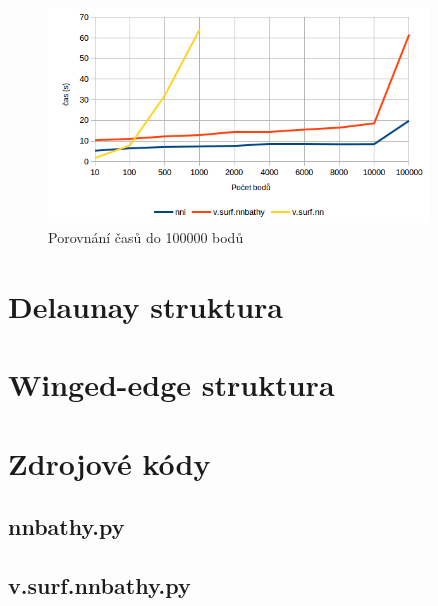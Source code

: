 \documentclass[12pt,a4paper]{article}
\begin{document}
\begin{figure}[h!]
\centering
\includegraphics[width=0.9\textwidth]{img/graf_detail.png}
\caption{Porovnání časů do 100000 bodů}
\label{fig:graf_det}
\end{figure}

\newpage
\section{Delaunay struktura}
\label{app:delaunay_struct}


\newpage
\section{Winged-edge struktura}
\label{app:edge_struct}



\newpage
\section{Zdrojové kódy}
\subsection{nnbathy.py}
\label{app:nnbathy}


\bigskip
\subsection{v.surf.nnbathy.py}
\label{app:v.surf}

\end{document}
